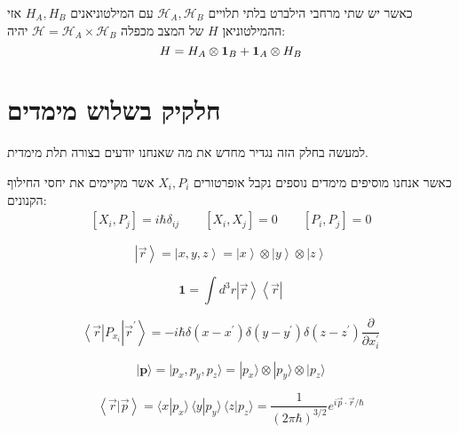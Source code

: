 \documentclass{tstextbook}
\begin{document}
\begin{proposition}
כאשר יש שתי מרחבי הילברט בלתי תלויים \(\mathcal{H}_{A},\mathcal{H}_{B}\) עם המילטוניאנים \(H_{A},H_{B}\) אזי ההמילטוניאן \(H\) של המצב מכפלה \(\mathcal{H}=\mathcal{H}_{A}\times \mathcal{H}_{B}\) יהיה:
$${ {H}}={ H}_{A}\otimes{\bf1}_{B}+{\bf1}_{A}\otimes{ H}_{B}$$

\end{proposition}
\section{חלקיק בשלוש מימדים}

למעשה בחלק הזה נגדיר מחדש את מה שאנחנו יודעים בצורה תלת מימדית.

\begin{proposition}
כאשר אנחנו מוסיפים מימדים נוספים נקבל אופרטורים \(X_{i},P_{i}\) אשר מקיימים את יחסי החילוף הקנונים:
$$\begin{array}{c}{{[X_{i},P_{j}]=i\hbar\delta_{i j}}}\qquad  {{[X_{i},X_{j}]=0}}\qquad  {{[P_{i},P_{j}]=0}}\end{array}$$

\end{proposition}
\begin{definition}
$$\left|\vec{r}\right\rangle=\left|x,y,z\right\rangle=\left|x\right\rangle\otimes\left|y\right\rangle\otimes\left|z\right\rangle$$

\end{definition}
\begin{proposition}
$$\mathbf{1}=\int d^{3}r\left|\vec{r}\right\rangle\left\langle\vec{r}\right|$$

\end{proposition}
\begin{proposition}
$$\left\langle\vec{r}\right|P_{x_{i}}\left|\vec{r}^{\prime}\right\rangle=-i\hbar\delta\left(x-x^{\prime}\right)\delta\left(y-y^{\prime}\right)\delta\left(z-z^{\prime}\right){\frac{\partial}{\partial x^{\prime}_{i}}}$$

\end{proposition}
\begin{definition}
$$|{\textbf{p}}\rangle=|p_{x},p_{y},p_{z}\rangle=|p_{x}\rangle\otimes|p_{y}\rangle\otimes|p_{z}\rangle$$

\end{definition}
\begin{proposition}
$$\left\langle  \vec{r}|\vec{p}  \right\rangle =\langle x|p_{x}\rangle\,\langle y|p_{y}\rangle\,\langle z|p_{z}\rangle=\frac{1}{\left(2\pi\hbar\right)^{3/2}}e^{i{\vec p}\cdot{\vec r}/\hbar}$$

\end{proposition}
\end{document}
